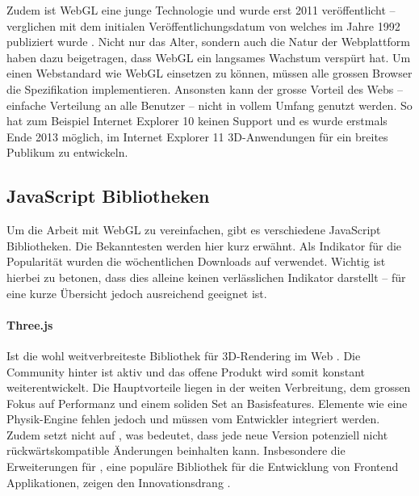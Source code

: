 Zudem ist WebGL eine junge Technologie und wurde erst 2011 veröffentlicht – verglichen mit dem initialen Veröffentlichungsdatum von  welches im Jahre 1992 publiziert wurde \cite{webGl1Spec,openGlSpec}.
Nicht nur das Alter, sondern auch die Natur der Webplattform haben dazu beigetragen, dass WebGL ein langsames Wachstum verspürt hat. Um einen Webstandard wie WebGL einsetzen zu können, müssen alle grossen Browser die Spezifikation implementieren. Ansonsten kann der grosse Vorteil des Webs – einfache Verteilung an alle Benutzer – nicht in vollem Umfang genutzt werden. So hat zum Beispiel Internet Explorer 10 keinen Support und es wurde erstmals Ende 2013 möglich, im Internet Explorer 11 3D-Anwendungen für ein breites Publikum zu entwickeln.

\subsection{JavaScript Bibliotheken}
Um die Arbeit mit WebGL zu vereinfachen, gibt es verschiedene JavaScript Bibliotheken. Die Bekanntesten werden hier kurz erwähnt. Als Indikator für die Popularität wurden die wöchentlichen Downloads auf  verwendet. Wichtig ist hierbei zu betonen, dass dies alleine keinen verlässlichen Indikator darstellt – für eine kurze Übersicht jedoch ausreichend geeignet ist.

\paragraph{Three.js}
Ist die wohl weitverbreiteste Bibliothek für 3D-Rendering im Web \cite{threeNpmPackage}.
Die Community hinter  ist aktiv und das offene Produkt wird somit konstant weiterentwickelt.
Die Hauptvorteile liegen in der weiten Verbreitung, dem grossen Fokus auf Performanz und einem soliden Set an Basisfeatures. Elemente wie eine Physik-Engine fehlen jedoch und müssen vom Entwickler integriert werden. Zudem setzt  nicht auf , was bedeutet, dass jede neue Version potenziell nicht rückwärtskompatible Änderungen beinhalten kann.
Insbesondere die Erweiterungen für , eine populäre Bibliothek für die Entwicklung von Frontend Applikationen, zeigen den Innovationsdrang \cite{threeFiberGithub, reactNpmPackage}.

